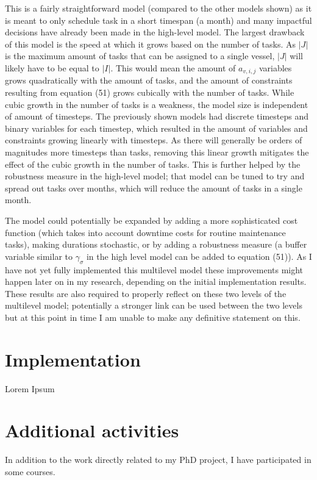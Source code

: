 \documentclass[a4paper,12pt]{article}
\begin{document}
\bigskip

This is a fairly straightforward model (compared to the other models shown) as it is meant to only schedule task in a short timespan (a month) and many impactful decisions have already been made in the high-level model. The largest drawback of this model is the speed at which it grows based on the number of tasks. As $|J|$ is the maximum amount of tasks that can be assigned to a single vessel, $|J|$ will likely have to be equal to $|I|$. This would mean the amount of $a_{v,i,j}$ variables grows quadratically with the amount of tasks, and the amount of constraints resulting from equation (51) grows cubically with the number of tasks. While cubic growth in the number of tasks is a weakness, the model size is independent of amount of timesteps. The previously shown models had discrete timesteps and binary variables for each timestep, which resulted in the amount of variables and constraints growing linearly with timesteps. As there will generally be orders of magnitudes more timesteps than tasks, removing this linear growth mitigates the effect of the cubic growth in the number of tasks. This is further helped by the robustness measure in the high-level model; that model can be tuned to try and spread out tasks over months, which will reduce the amount of tasks in a single month. 

The model could potentially be expanded by adding a more sophisticated cost function (which takes into account downtime costs for routine maintenance tasks), making durations stochastic, or by adding a robustness measure (a buffer variable similar to $\gamma_\sigma$ in the high level model can be added to equation (51)). As I have not yet fully implemented this multilevel model these improvements might happen later on in my research, depending on the initial implementation results. These results are also required to properly reflect on these two levels of the multilevel model; potentially a stronger link can be used between the two levels but at this point in time I am unable to make any definitive statement on this. 

\pagebreak

\section{Implementation}\label{s:impl}
Lorem Ipsum 

\pagebreak

\section{Additional activities} \label{s:addit} %
In addition to the work directly related to my PhD project, I have participated in some courses. 
\end{document}
